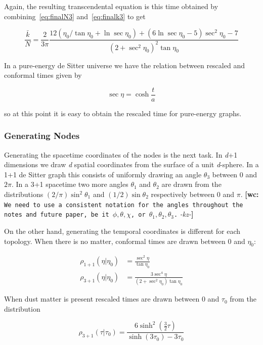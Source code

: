 \documentclass[preprint,notitlepage,amsmath,amssymb,floatfix]{revtex4-1}
\newcommand{\XXX}[3]{{\bf [#1: } {\tt #3} {\it -#2-}{\bf ]}}
\begin{document}
\noindent Again, the resulting transcendental equation is this time obtained by combining~\eqref{eq:finalN3} and~\eqref{eq:finalk3} to get

\begin{equation}
\label{eq:trans3}
\frac{\bar k}{N} = \frac{2}{3\pi}\frac{12\left(\eta_0/\tan\eta_0 + \ln\sec\eta_0\right) + \left(6\ln\sec\eta_0 - 5\right)\sec^2\eta_0 - 7}{\left(2+\sec^2\eta_0\right)^2\tan\eta_0}
\end{equation}

\noindent In a pure-energy de Sitter universe we have the relation between rescaled and conformal times given by 

\begin{equation}
\sec\eta = \cosh\frac{t}{a}
\end{equation}

\noindent so at this point it is easy to obtain the rescaled time for pure-energy graphs.
\subsubsection{Generating Nodes}
Generating the spacetime coordinates of the nodes is the next task.  
In \textit{d}+1 dimensions we draw \textit{d} spatial coordinates from the surface of a unit \textit{d}-sphere.  
In a 1+1 de Sitter graph this consists of uniformly drawing an angle $\theta_3$ between 0 and $2\pi$.  
In a 3+1 spacetime two more angles $\theta_1$ and $\theta_2$ are drawn from the distributions $\left(2/\pi\right)\sin^2\theta_1$ and $\left(1/2\right)\sin\theta_2$ respectively between 0 and $\pi$. \XXX{wc}{kz}{We need to use a consistent notation for the angles throughout the notes and future paper, be it $\phi,\theta,\chi$, or $\theta_1,\theta_2,\theta_3$.}\par
On the other hand, generating the temporal coordinates is different for each topology.
When there is no matter, conformal times are drawn between 0 and $\eta_0$:

\begin{align}
\rho_{1+1}\left(\eta|\eta_0\right) &= \frac{\sec^2\eta}{\tan\eta_0} \\
\rho_{3+1}\left(\eta|\eta_0\right) &= \frac{3\sec^4\eta}{\left(2+\sec^2\eta_0\right)\tan\eta_0}
\end{align}

\noindent When dust matter is present rescaled times are drawn between 0 and $\tau_0$ from the distribution

\begin{equation}
\label{eq:rhotau3}
\rho_{3+1}\left(\tau|\tau_0\right) = \frac{6\sinh^2\left(\frac{3}{2}\tau\right)}{\sinh\left(3\tau_0\right) - 3\tau_0}
\end{equation}
\end{document}
